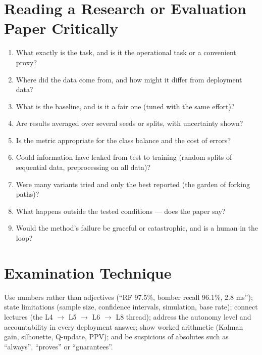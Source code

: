 \documentclass[11pt]{article}
\begin{document}
\section{Reading a Research or Evaluation Paper Critically}
\begin{enumerate}
\item What exactly is the task, and is it the operational task or a convenient proxy?
\item Where did the data come from, and how might it differ from deployment data?
\item What is the baseline, and is it a fair one (tuned with the same effort)?
\item Are results averaged over several seeds or splits, with uncertainty shown?
\item Is the metric appropriate for the class balance and the cost of errors?
\item Could information have leaked from test to training (random splits of sequential data, preprocessing on all data)?
\item Were many variants tried and only the best reported (the garden of forking paths)?
\item What happens outside the tested conditions --- does the paper say?
\item Would the method's failure be graceful or catastrophic, and is a human in the loop?
\end{enumerate}

\section{Examination Technique}
Use numbers rather than adjectives (``RF 97.5\%, bomber recall 96.1\%, 2.8 ms''); state limitations (sample size, confidence intervals, simulation, base rate); connect lectures (the L4 $\to$ L5 $\to$ L6 $\to$ L8 thread); address the autonomy level and accountability in every deployment answer; show worked arithmetic (Kalman gain, silhouette, Q-update, PPV); and be suspicious of absolutes such as ``always'', ``proves'' or ``guarantees''.
\end{document}
